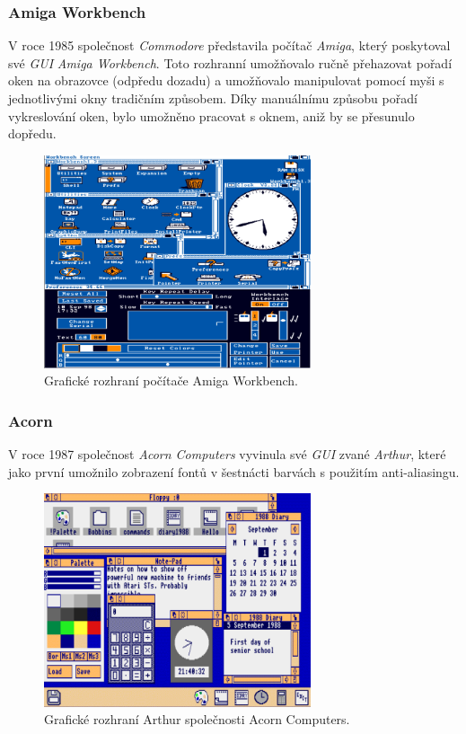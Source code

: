 \documentclass[11pt,twoside,a4paper]{book}
\begin{document}
\subsubsection{Amiga Workbench}
V roce 1985 společnost \textit{Commodore} představila počítač \textit{Amiga}, který poskytoval své \textit{GUI} \textit{Amiga Workbench}. Toto rozhranní umožňovalo ručně přehazovat pořadí oken na obrazovce (odpředu dozadu) a umožňovalo manipulovat pomocí myši s jednotlivými okny tradičním způsobem. Díky manuálnímu způsobu pořadí vykreslování oken, bylo umožněno pracovat s oknem, aniž by se přesunulo dopředu.
\begin{figure}[!ht]
\begin{center}
  \includegraphics[width=0.7\textwidth]{amiga}
\caption{{\label{fig:amigaGUI}} Grafické rozhraní počítače Amiga Workbench.}
\end{center}
\end{figure}

\subsubsection{Acorn}
V roce 1987 společnost \textit{Acorn Computers} vyvinula své \textit{GUI} zvané \textit{Arthur}, které jako první umožnilo zobrazení fontů v šestnácti barvách s použitím anti-aliasingu.
\begin{figure}[!ht]
\begin{center}
  \includegraphics[width=0.7\textwidth]{arthur}
\caption{{\label{fig:arthurGUI}} Grafické rozhraní Arthur společnosti Acorn Computers.}
\end{center}
\end{figure}
\end{document}
